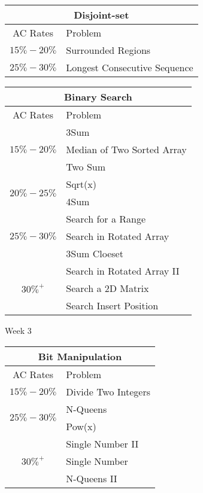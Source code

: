\documentclass[paper=a4, fontsize=11pt]{scrartcl} %
\begin{document}
\begin{center}
  \vspace{20mm}

  \begin{tabular}{|c|l|}
      \hline
      \multicolumn{2}{|c|}{Disjoint-set} \\
      \hline
      AC Rates      &   Problem     \\
      \hline
      \multirow{1}{*}{$15\%-20\%$}  &    Surrounded Regions    \\
      \hline
      \multirow{1}{*}{$25\%-30\%$}  &   Longest Consecutive Sequence \\
      \hline
  \end{tabular}

  \vspace{20mm}

  \begin{tabular}{|c|l|}
      \hline
      \multicolumn{2}{|c|}{Binary Search} \\
      \hline
      AC Rates      &   Problem     \\
      \hline
      \multirow{3}{*}{$15\%-20\%$}  &   3Sum\\
          & Median of Two Sorted Array  \\
          & Two Sum \\
      \hline
      \multirow{2}{*}{$20\%-25\%$}  &   Sqrt(x)    \\
          & 4Sum\\
      \hline
      \multirow{3}{*}{$25\%-30\%$}  &   Search for a Range\\
          & Search in Rotated Array\\
          & 3Sum Cloeset\\
      \hline
      \multirow{3}{*}{$30\%^+$}  &   Search in Rotated Array II \\
          & Search a 2D Matrix    \\
          & Search Insert Position  \\
      \hline
  \end{tabular}

  \pagebreak

  \begin{center}
    Week 3
  \end{center}
  \begin{tabular}{|c|l|}
      \hline
      \multicolumn{2}{|c|}{Bit Manipulation} \\
      \hline
      AC Rates      &   Problem     \\
      \hline
      \multirow{1}{*}{$15\%-20\%$}  &    Divide Two Integers    \\
      \hline
      \multirow{2}{*}{$25\%-30\%$}  &    N-Queens    \\
          & Pow(x)  \\
      \hline
      \multirow{3}{*}{$30\%^+$}  &  Single Number II  \\
          & Single Number \\
          & N-Queens II  \\
      \hline
  \end{tabular}


\end{center}
\end{document}
